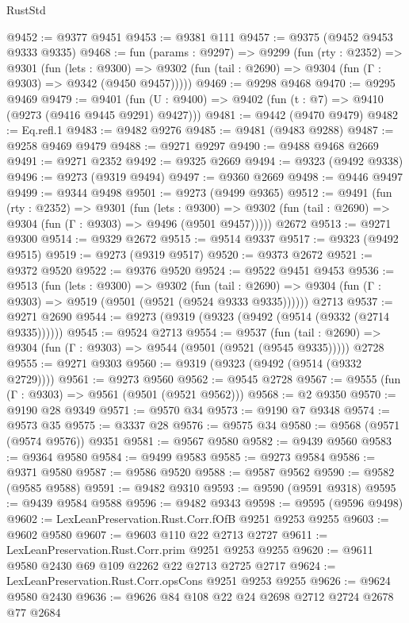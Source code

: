 \begin{lexlean}{RustStd}
\begin{coremodule}
@9452 := @9377 @9451
@9453 := @9381 @111
@9457 := @9375 (@9452 @9453 @9333 @9335)
@9468 := fun (params : @9297) =>
  @9299
    (fun (rty : @2352) =>
    @9301
      (fun (lets : @9300) =>
      @9302 (fun (tail : @2690) => @9304 (fun (Γ : @9303) => @9342 (@9450 @9457)))))
@9469 := @9298 @9468
@9470 := @9295 @9469
@9479 := @9401 (fun (U : @9400) => @9402 (fun (t : @7) => @9410 (@9273 (@9416 @9445 @9291) @9427)))
@9481 := @9442 (@9470 @9479)
@9482 := Eq.refl.{1}
@9483 := @9482 @9276
@9485 := @9481 (@9483 @9288)
@9487 := @9258 @9469 @9479
@9488 := @9271 @9297
@9490 := @9488 @9468 @2669
@9491 := @9271 @2352
@9492 := @9325 @2669
@9494 := @9323 (@9492 @9338)
@9496 := @9273 (@9319 @9494)
@9497 := @9360 @2669
@9498 := @9446 @9497
@9499 := @9344 @9498
@9501 := @9273 (@9499 @9365)
@9512 := @9491
    (fun (rty : @2352) =>
    @9301
      (fun (lets : @9300) =>
      @9302 (fun (tail : @2690) => @9304 (fun (Γ : @9303) => @9496 (@9501 @9457)))))
    @2672
@9513 := @9271 @9300
@9514 := @9329 @2672
@9515 := @9514 @9337
@9517 := @9323 (@9492 @9515)
@9519 := @9273 (@9319 @9517)
@9520 := @9373 @2672
@9521 := @9372 @9520
@9522 := @9376 @9520
@9524 := @9522 @9451 @9453
@9536 := @9513
    (fun (lets : @9300) =>
    @9302
      (fun (tail : @2690) => @9304 (fun (Γ : @9303) => @9519 (@9501 (@9521 (@9524 @9333 @9335))))))
    @2713
@9537 := @9271 @2690
@9544 := @9273 (@9319 (@9323 (@9492 (@9514 (@9332 (@2714 @9335))))))
@9545 := @9524 @2713
@9554 := @9537
    (fun (tail : @2690) => @9304 (fun (Γ : @9303) => @9544 (@9501 (@9521 (@9545 @9335)))))
    @2728
@9555 := @9271 @9303
@9560 := @9319 (@9323 (@9492 (@9514 (@9332 @2729))))
@9561 := @9273 @9560
@9562 := @9545 @2728
@9567 := @9555 (fun (Γ : @9303) => @9561 (@9501 (@9521 @9562)))
@9568 := @2 @9350
@9570 := @9190 @28 @9349
@9571 := @9570 @34
@9573 := @9190 @7 @9348
@9574 := @9573 @35
@9575 := @3337 @28
@9576 := @9575 @34
@9580 := @9568 (@9571 (@9574 @9576)) @9351
@9581 := @9567 @9580
@9582 := @9439 @9560
@9583 := @9364 @9580
@9584 := @9499 @9583
@9585 := @9273 @9584
@9586 := @9371 @9580
@9587 := @9586 @9520
@9588 := @9587 @9562
@9590 := @9582 (@9585 @9588)
@9591 := @9482 @9310
@9593 := @9590 (@9591 @9318)
@9595 := @9439 @9584 @9588
@9596 := @9482 @9343
@9598 := @9595 (@9596 @9498)
@9602 := LexLeanPreservation.Rust.Corr.fOfB @9251 @9253 @9255
@9603 := @9602 @9580
@9607 := @9603 @110 @22 @2713 @2727
@9611 := LexLeanPreservation.Rust.Corr.prim @9251 @9253 @9255
@9620 := @9611 @9580 @2430 @69 @109 @2262 @22 @2713 @2725 @2717
@9624 := LexLeanPreservation.Rust.Corr.opsCons @9251 @9253 @9255
@9626 := @9624 @9580 @2430
@9636 := @9626 @84 @108 @22 @24 @2698 @2712 @2724 @2678 @77 @2684

\end{coremodule}
\end{lexlean}
